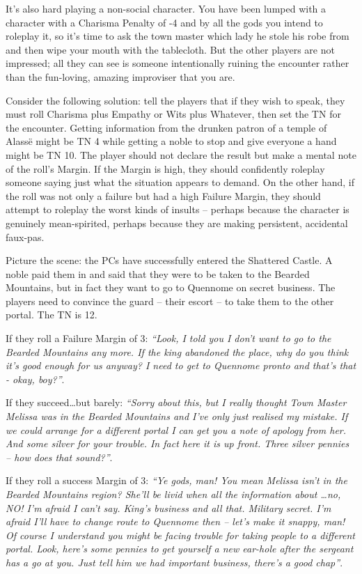 \begin{multicols}{2}
It's also hard playing a non-social character.  You have been lumped with a character with a Charisma Penalty of -4 and by all the gods you intend to roleplay it, so it's time to ask the town master which lady he stole his robe from and then wipe your mouth with the tablecloth.  But the other players are not impressed; all they can see is someone intentionally ruining the encounter rather than the fun-loving, amazing improviser that you are.

Consider the following solution: tell the players that if they wish to speak, they must roll Charisma plus Empathy or Wits plus Whatever, then set the TN for the encounter.  Getting information from the drunken patron of a temple of Alass\"{e} might be TN 4 while getting a noble to stop and give everyone a hand might be TN 10.  The player should not declare the result but make a mental note of the roll's Margin.  If the Margin is high, they should confidently roleplay someone saying just what the situation appears to demand.  On the other hand, if the roll was not only a failure but had a high Failure Margin, they should attempt to roleplay the worst kinds of insults -- perhaps because the character is genuinely mean-spirited, perhaps because they are making persistent, accidental faux-pas.

Picture the scene: the PCs have successfully entered the Shattered Castle.  A noble paid them in and said that they were to be taken to the Bearded Mountains, but in fact they want to go to Quennome on secret business.  The players need to convince the guard -- their escort -- to take them to the other portal.  The TN is 12.

If they roll a Failure Margin of 3: \textit{``Look, I told you I don't want to go to the Bearded Mountains any more.  If the king abandoned the place, why do you think it's good enough for us anyway?  I need to get to Quennome pronto and that's that - okay, boy?''}.

If they succeed\ldots but barely: \textit{``Sorry about this, but I really thought Town Master Melissa was in the Bearded Mountains and I've only just realised my mistake.  If we could arrange for a different portal I can get you a note of apology from her.  And some silver for your trouble.  In fact here it is up front.  Three silver pennies -- how does that sound?''}.

If they roll a success Margin of 3: \textit{``Ye gods, man!  You mean Melissa isn't in the Bearded Mountains region?  She'll be livid when all the information about \dots no, NO! I'm afraid I can't say.  King's business and all that.  Military secret.  I'm afraid I'll have to change route to Quennome then -- let's make it snappy, man!  Of course I understand you might be facing trouble for taking people to a different portal.  Look, here's some pennies to get yourself a new ear-hole after the sergeant has a go at you.  Just tell him we had important business, there's a good chap''}.


\end{multicols}
